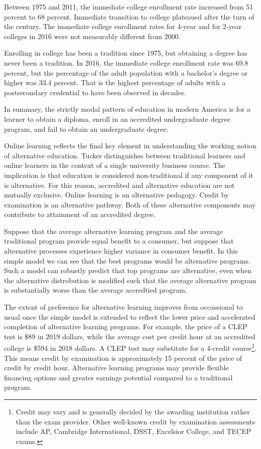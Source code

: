 \documentclass[AER]{./aea-latex-templates/AEA}
\begin{document}
Between 1975 and 2011, the immediate college enrollment
rate increased from 51 percent to 68 percent. Immediate transition to
college plateaued after the turn of the century. The immediate college
enrollment rates for 4-year and for 2-year colleges in 2016 were not
measurably different from 2000\cite{nces2019condition}.

Enrolling in college has been a tradition since 1975, but obtaining a
degree has never been a tradition. In 2016, the immediate college
enrollment rate was 69.8 percent\cite{nces_2019}, but the
percentage of the adult population with a bachelor’s degree or higher was
33.4 percent\cite{censusbureau_2017}. That is the highest percentage of
adults with a postsecondary credential to have been observed in decades.

In summary, the strictly modal pattern of education in modern America
is for a learner to obtain a diploma, enroll in an accredited undergraduate degree
program, and fail to obtain an undergraduate degree.

Online learning reflects the final key element in understanding the working notion of
alternative education. Tucker\cite{tucker2001distance} distinguishes between traditional
learners and online learners in the context of a single university business course.
The implication is that education is considered non-traditional if any component of it
is alternative. For this reason, accredited and alternative education are not mutually exclusive.
Online learning is an alternative pedagogy. Credit by examination is an alternative
pathway. Both of these alternative components may contribute to attainment of an accredited degree.

Suppose that the average alternative learning program and the average traditional program
provide equal benefit to a consumer, but suppose that alternative
processes experience higher variance in consumer benefit. In this
simple model we can see that the best programs would be alternative
programs. Such a model can robustly predict that top programs are
alternative, even when the alternative distrobution is modified such
that the average alternative program is substantially worse than the
average accredtied program.

The extent of preference for alternative learning improves from
occassional to usual once the simple model is extended to reflect the
lower price and accelerated completion of alternative learning programs.
For example, the price of a CLEP test is \$89 in 2019 dollars\cite{collegeboard_2019}, while
the average cost per credit hour at an accredited college is \$594 in 2018
dollars\cite{kirkham2018study}. A CLEP test may substitute for a 4-credit course\footnote{Credit
may vary and is generally decided by the awarding institution rather than
the exam provider. Other well-known credit by examination assessments include AP, Cambridge International, DSST, Excelsior
College, and TECEP exams.}. This means credit by examination is approximately 15 percent of the price of credit by credit hour.
Alternative learning programs may provide flexible financing options and greater earnings potential compared to a traditional program.
\end{document}

